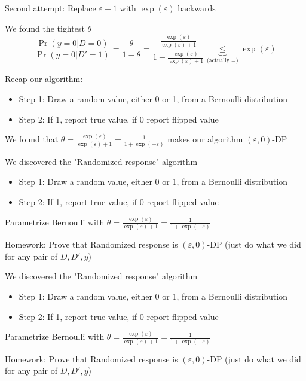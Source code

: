 \documentclass[12pt,aspectratio=169,handout]{beamer}
\begin{document}
\begin{frame}{Second attempt: Replace $\varepsilon + 1$ with $\exp(\varepsilon)$ backwards}

\begin{block}{We found the tightest $\theta$}
$$
\frac{\Pr(y = 0 | D = 0)}{\Pr(y = 0 | D' = 1)} =
\frac{\theta}{1 - \theta} =
\frac{
\frac{ \exp(\varepsilon)}{ \exp(\varepsilon) + 1}
}{
	1 - \frac{ \exp(\varepsilon)}{ \exp(\varepsilon) + 1}
}
\underbrace{\leq}_{\text{(actually } = \text{)}}
\exp(\varepsilon)
$$
\end{block}


Recap our algorithm:

\begin{itemize}
\item Step 1: Draw a random value, either 0 or 1, from a Bernoulli distribution
\item Step 2: If 1, report true value, if 0 report flipped value
\end{itemize}

We found that $\theta = \frac{\exp(\varepsilon)}{\exp(\varepsilon) + 1} = \frac{1}{1 + \exp(- \varepsilon)}$ makes our algorithm $(\varepsilon, 0)$-DP


\end{frame}


\begin{frame}{We discovered the "Randomized response" algorithm}

\begin{itemize}
\item Step 1: Draw a random value, either 0 or 1, from a Bernoulli distribution
\item Step 2: If 1, report true value, if 0 report flipped value
\end{itemize}

Parametrize Bernoulli with $\theta = \frac{\exp(\varepsilon)}{\exp(\varepsilon) + 1} = \frac{1}{1 + \exp(- \varepsilon)}$

Homework: Prove that Randomized response is $(\varepsilon, 0)$-DP (just do what we did for any pair of $D, D', y$)


\end{frame}





\begin{frame}{We discovered the "Randomized response" algorithm}

\begin{itemize}
\item Step 1: Draw a random value, either 0 or 1, from a Bernoulli distribution
\item Step 2: If 1, report true value, if 0 report flipped value
\end{itemize}

Parametrize Bernoulli with $\theta = \frac{\exp(\varepsilon)}{\exp(\varepsilon) + 1} = \frac{1}{1 + \exp(- \varepsilon)}$

Homework: Prove that Randomized response is $(\varepsilon, 0)$-DP (just do what we did for any pair of $D, D', y$)


\end{frame}
\end{document}
